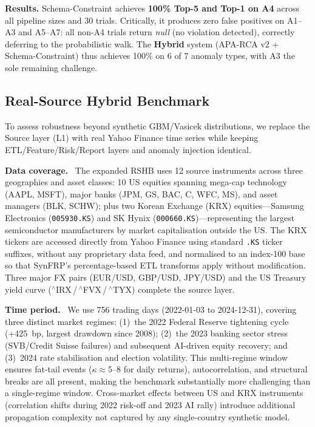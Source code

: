 \documentclass{article}
\newcommand{\aparca}{\textsc{APA-RCA}}
\begin{document}
\textbf{Results.}
Schema-Constraint achieves \textbf{100\% Top-5 and Top-1 on A4} across all
pipeline sizes and 30 trials.
Critically, it produces zero false positives on A1--A3 and A5--A7: all
non-A4 trials return \textit{null} (no violation detected), correctly deferring
to the probabilistic walk.
The \textbf{Hybrid} system (\aparca{} v2 + Schema-Constraint) thus achieves
100\% on 6 of 7 anomaly types, with A3 the sole remaining challenge.

\subsection{Real-Source Hybrid Benchmark}
\label{sec:rshb}

To assess robustness beyond synthetic GBM/Vasicek distributions, we replace
the Source layer (L1) with real Yahoo Finance time series while keeping
ETL/Feature/Risk/Report layers and anomaly injection identical.

\textbf{Data coverage.}~
The expanded RSHB uses 12 source instruments across three geographies and asset classes:
10 US equities spanning mega-cap technology (AAPL, MSFT), major banks (JPM, GS, BAC, C, WFC, MS),
and asset managers (BLK, SCHW); plus two Korean Exchange (KRX) equities---Samsung
Electronics (\texttt{005930.KS}) and SK Hynix (\texttt{000660.KS})---representing the
largest semiconductor manufacturers by market capitalisation outside the US.
The KRX tickers are accessed directly from Yahoo Finance using standard \texttt{.KS} ticker
suffixes, without any proprietary data feed, and normalised to an index-100 base so that
SynFRP's percentage-based ETL transforms apply without modification.
Three major FX pairs (EUR/USD, GBP/USD, JPY/USD) and the US Treasury yield curve
($^{\wedge}$IRX\,/\,$^{\wedge}$FVX\,/\,$^{\wedge}$TYX) complete the source layer.

\textbf{Time period.}~
We use 756 trading days (2022-01-03 to 2024-12-31), covering three distinct market
regimes: (1)~the 2022 Federal Reserve tightening cycle (+425~bp, largest drawdown
since 2008); (2)~the 2023 banking sector stress (SVB/Credit Suisse failures) and
subsequent AI-driven equity recovery; and (3)~2024 rate stabilisation and election
volatility.
This multi-regime window ensures fat-tail events ($\kappa \approx 5$--8 for daily
returns), autocorrelation, and structural breaks are all present, making the benchmark
substantially more challenging than a single-regime window.
Cross-market effects between US and KRX instruments (correlation shifts during
2022 risk-off and 2023 AI rally) introduce additional propagation complexity
not captured by any single-country synthetic model.
\end{document}
